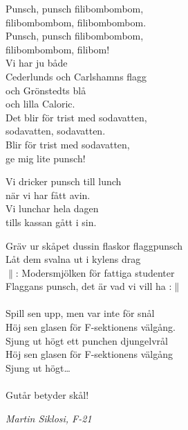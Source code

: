 \documentclass[a6paper, 10pt, twoside]{article}
\begin{document}
\begin{center}
\end{center}
\begin{lyrics}
Punsch, punsch filibombombom,\\
filibombombom, filibombombom.\\
Punsch, punsch filibombombom,\\
filibombombom, filibom!
\vspace{5pt}\\
Vi har ju både \\
Cederlunds och Carlshamns flagg\\
och Grönstedts blå\\
och lilla Caloric.\\
Det blir för trist med sodavatten,\\
sodavatten, sodavatten.\\
Blir för trist med sodavatten,\\
ge mig lite punsch!
\end{lyrics}

\noindent

\begin{center}
\end{center}
\begin{lyrics}
Vi dricker punsch till lunch\\
när vi har fått avin.\\
Vi lunchar hela dagen\\
tills kassan gått i sin.
\vspace{10pt}\\
\end{lyrics}
\begin{center}
\vspace{40pt}
\end{center}
\begin{lyrics}
Gräv ur skåpet dussin flaskor flaggpunsch\\
Låt dem svalna ut i kylens drag \\
$\|$: Modersmjölken för fattiga studenter\\
Flaggans punsch, det är vad vi vill ha :$\|$\\
\vspace{5pt}\\
Spill sen upp, men var inte för snål\\
Höj sen glasen för F-sektionens välgång.\\
Sjung ut högt ett punchen djungelvrål\\
Höj sen glasen för F-sektionens välgång\\
Sjung ut högt…\\
\vspace{5pt}\\
Gutår betyder skål!
\end{lyrics}
\begin{flushright}
\textit{Martin Siklosi, F-21}
\end{flushright}
\end{document}
